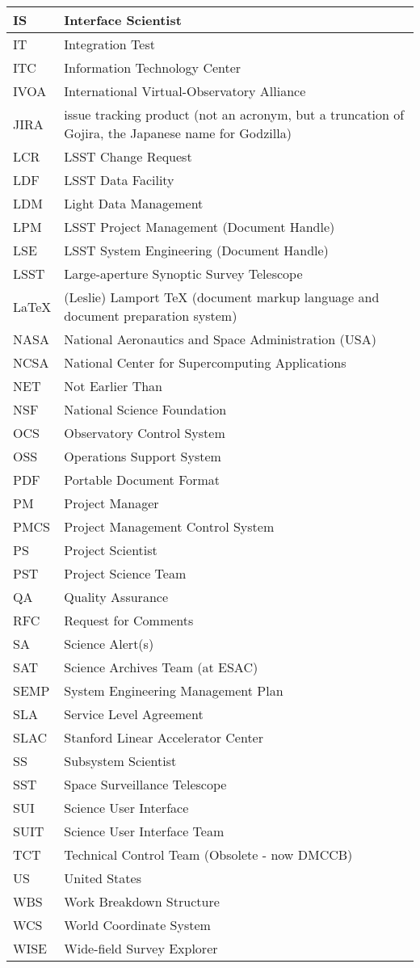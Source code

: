 \begin{longtable}{|l|p{}|}
IS&Interface Scientist \\\hline
IT&Integration Test \\\hline
ITC&Information Technology Center \\\hline
IVOA&International Virtual-Observatory Alliance \\\hline
JIRA&issue tracking product (not an acronym, but a truncation of Gojira, the Japanese name for Godzilla) \\\hline
LCR&LSST Change Request \\\hline
LDF&LSST Data Facility \\\hline
LDM&Light Data Management \\\hline
LPM&LSST Project Management (Document Handle) \\\hline
LSE&LSST System Engineering (Document Handle) \\\hline
LSST&Large-aperture Synoptic Survey Telescope \\\hline
LaTeX&(Leslie) Lamport TeX (document markup language and document preparation system) \\\hline
NASA&National Aeronautics and Space Administration (USA) \\\hline
NCSA&National Center for Supercomputing Applications \\\hline
NET&Not Earlier Than \\\hline
NSF&National Science Foundation \\\hline
OCS&Observatory Control System \\\hline
OSS&Operations Support System \\\hline
PDF&Portable Document Format \\\hline
PM&Project Manager \\\hline
PMCS&Project Management Control System \\\hline
PS&Project Scientist \\\hline
PST&Project Science Team \\\hline
QA&Quality Assurance \\\hline
RFC&Request for Comments \\\hline
SA&Science Alert(s) \\\hline
SAT&Science Archives Team (at ESAC) \\\hline
SEMP&System Engineering Management Plan \\\hline
SLA&Service Level Agreement \\\hline
SLAC&Stanford Linear Accelerator Center \\\hline
SS&Subsystem Scientist \\\hline
SST&Space Surveillance Telescope \\\hline
SUI&Science User Interface \\\hline
SUIT&Science User Interface Team \\\hline
TCT&Technical Control Team (Obsolete - now DMCCB) \\\hline
US&United States \\\hline
WBS&Work Breakdown Structure \\\hline
WCS&World Coordinate System \\\hline
WISE&Wide-field Survey Explorer \\\hline
\end{longtable}

